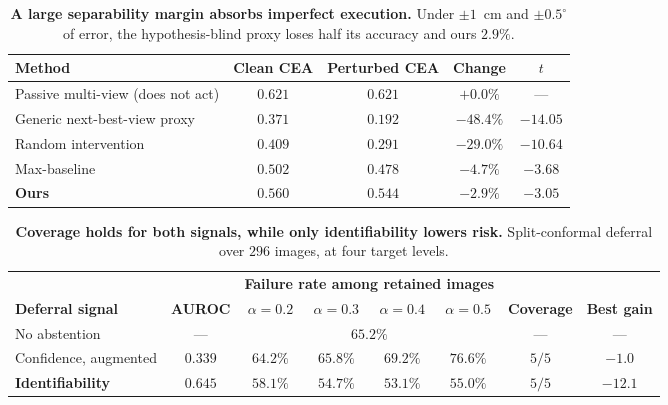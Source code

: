 \documentclass{article} %
\theoremstyle{defstyle}
\theoremstyle{plain}
\begin{document}
\begin{table}[!ht]
\caption{\textbf{A large separability margin absorbs imperfect execution.} Under $\pm 1$~cm and
$\pm 0.5^{\circ}$ of error, the hypothesis-blind proxy loses half its accuracy and ours
$2.9\%$.}
\label{tab:noise}
\begin{center}
\footnotesize
\begin{tabular}{lcccc}
\toprule
\textbf{Method} & \textbf{Clean CEA} & \textbf{Perturbed CEA} & \textbf{Change} & \textbf{$t$} \\
\midrule
Passive multi-view (does not act) & $0.621$ & $0.621$ & $+0.0\%$ & --- \\
Generic next-best-view proxy   & $0.371$ & $0.192$ & $-48.4\%$ & $-14.05$ \\
Random intervention & $0.409$ & $0.291$ & $-29.0\%$ & $-10.64$ \\
Max-baseline        & $0.502$ & $0.478$ & $-4.7\%$  & $-3.68$ \\
\textbf{Ours}       & $0.560$ & $0.544$ & $\mathbf{-2.9\%}$ & $-3.05$ \\
\bottomrule
\end{tabular}
\end{center}
\end{table}

\begin{table}[!ht]
\caption{\textbf{Coverage holds for both signals, while only identifiability lowers risk.}
Split-conformal deferral over $296$ images, at four target levels.}
\label{tab:conformal}
\begin{center}
\footnotesize
\begin{tabular}{lccccccc}
\toprule
& & \multicolumn{4}{c}{\textbf{Failure rate among retained images}} & & \\
\cmidrule(lr){3-6}
\textbf{Deferral signal} & \textbf{AUROC} & $\alpha{=}0.2$ & $\alpha{=}0.3$ &
$\alpha{=}0.4$ & $\alpha{=}0.5$ & \textbf{Coverage} & \textbf{Best gain} \\
\midrule
No abstention            & ---     & \multicolumn{4}{c}{$65.2\%$} & --- & --- \\
Confidence, augmented & $0.339$ & $64.2\%$ & $65.8\%$ & $69.2\%$ & $76.6\%$ & $5/5$ & $-1.0$ \\
\textbf{Identifiability} & $\mathbf{0.645}$ & $58.1\%$ & $54.7\%$ & $\mathbf{53.1\%}$ & $55.0\%$ & $5/5$ & $\mathbf{-12.1}$ \\
\bottomrule
\end{tabular}
\end{center}
\end{table}
\end{document}
